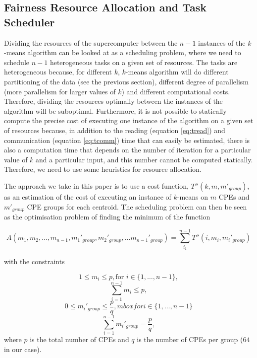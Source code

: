 \documentclass[10pt,journal,compsoc]{IEEEtran}
\begin{document}
\subsection{Fairness Resource Allocation and Task Scheduler}
Dividing the resources of the supercomputer between the $n-1$
instances of the $k$-means algorithm can be looked at as a scheduling
problem, where we need to schedule $n-1$ heterogeneous tasks on a
given set of resources. The tasks are heterogeneous because, for
different $k$, $k$-means algorithm will do different partitioning of
the data (see the previous section), different degree of parallelism
(more parallelism for larger values of $k$) and different
computational costs. Therefore, dividing the resources optimally
between the instances of the algorithm will be suboptimal.
Furthermore, it is not possible to statically
compute the precise cost of executing one instance of the algorithm on
a given set of resources because, in addition to the reading (equation
\ref{eq:tread}) and communication (equation \ref{eq:tcomm}) time that
can easily be estimated, there is also a computation time that depends
on the number of iteration for a particular value of $k$ and a
particular input, and this number cannot be computed
statically. Therefore, we need to use some heuristics for resource
allocation.

The approach we take in this paper is to use a cost function,
$T''(k,m,m'_{group})$, as an estimation of the cost of executing an
instance of $k$-means on $m$ CPEs and $m'_{group}$ CPE groups for each
centroid. The scheduling problem can then be seen as the optimisation
problem of finding the minimum of the function

$$A(m_1,m_2,\dots,m_{n-1}, m_1'_{group}, m_2'_{group}, \dots
m_{n-1}'_{group}) = \sum_{i_1}^{n-1} T''(i,m_i,m_i'_{group})$$

with the constraints

$$1 \leq m_i \leq p, \mbox{for } i \in \{1,\dots,n-1\},$$
$$\sum_{i=1}^{n-1} m_i \leq p,$$
$$0 \leq m_i'_{group} \leq \frac{p}{q}, mbox{for } i \in
\{1,\dots,n-1\}$$
$$ \sum_{i=1}^{n-1} m_i'_{group} = \frac{p}{q},$$
where $p$ is the total number of CPEs and $q$ is the number of CPEs
per group ($64$ in our case).
\end{document}
